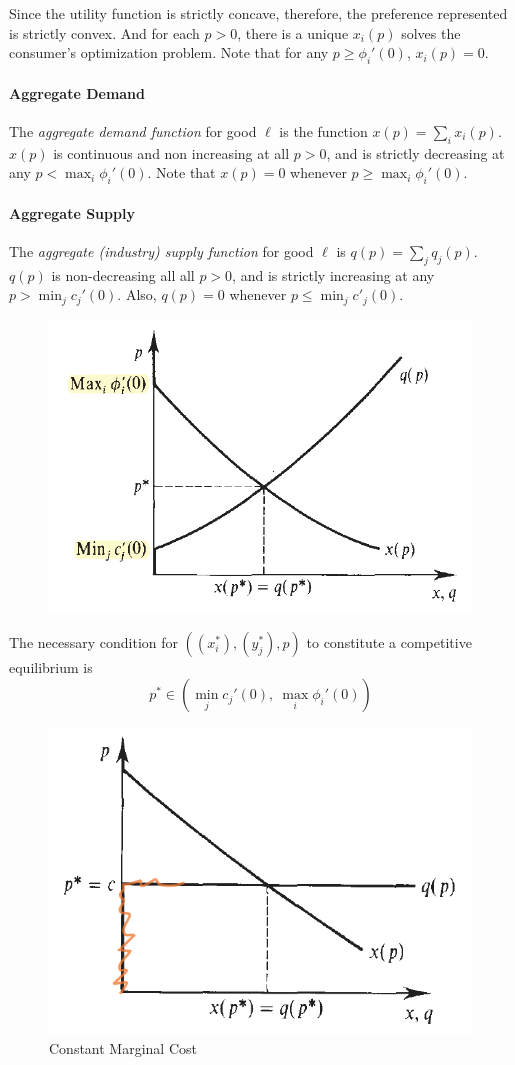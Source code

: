 \documentclass{article}
\begin{document}
	 	\begin{remark}
	 		Since the utility function is strictly concave, therefore, the preference represented is strictly convex. And for each $p > 0$, there is a unique $x_i(p)$ solves the consumer's optimization problem. Note that for any $p \geq \phi_i'(0)$, $x_i(p) = 0$.
	 	\end{remark}
	 	
	 	\paragraph{Aggregate Demand} The \emph{aggregate demand function} for good $\ell$ is the function $x(p) = \sum_i x_i(p)$. $x(p)$ is continuous and non increasing at all $p > 0$, and is strictly decreasing at any $p < \max_i \phi_i'(0)$. Note that $x(p) = 0$ whenever $p \geq \max_i \phi_i'(0)$.
	 	
	 	\paragraph{Aggregate Supply} The \emph{aggregate (industry) supply function} for good $\ell$ is $q(p) = \sum_j q_j(p)$. $q(p)$ is non-decreasing all all $p > 0$, and is strictly increasing at any $p > \min_j c_j'(0)$. Also, $q(p) = 0$ whenever $p \leq \min_j c'_j(0)$.
	 	\begin{figure}[h]
	 		\centering
	 		\includegraphics[width=0.5\linewidth]{figures/ASAD}
	 	\end{figure}
	 	
	 	\begin{remark}
	 		The necessary condition for $((x^*_i), (y^*_j), p)$ to constitute a competitive equilibrium is 
	 		\begin{equation}
	 			p^* \in \left (
	 				\min_j c_j'(0),\ \max_i \phi_i'(0)
	 			\right )
	 		\end{equation}
	 	\end{remark}
	 	
	 	\begin{figure}[h]
	 		\centering
	 		\includegraphics[width=0.5\linewidth]{figures/CSR}
	 		\caption{Constant Marginal Cost}
	 	\end{figure}
	 	
\end{document}
